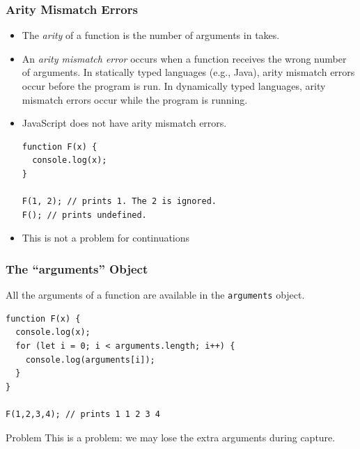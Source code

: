 \documentclass[8pt,pdf,handout]{beamer}
\begin{document}
\begin{frame}[fragile]
\frametitle{Arity Mismatch Errors}

\begin{itemize}

\item The \emph{arity} of a function is the number of arguments in takes.

\item An \emph{arity mismatch error} occurs when a function receives the wrong
number of arguments. In statically typed languages (e.g., Java), arity mismatch
errors occur before the program is run. In dynamically typed languages,
arity mismatch errors occur while the program is running.

\item JavaScript does not have arity mismatch errors.

\begin{lstlisting}
function F(x) {
  console.log(x);
}

F(1, 2); // prints 1. The 2 is ignored.
F(); // prints undefined.
\end{lstlisting}

\item This is not a problem for continuations

\end{itemize}

\end{frame}

\begin{frame}[fragile]
\frametitle{The ``arguments'' Object}

All the arguments of a function are available in the
\lstinline|arguments| object.

\begin{lstlisting}
function F(x) {
  console.log(x);
  for (let i = 0; i < arguments.length; i++) {
    console.log(arguments[i]);
  }
}

F(1,2,3,4); // prints 1 1 2 3 4
\end{lstlisting}

\begin{alertblock}{Problem}
This is a problem: we may lose the extra arguments during capture.
\end{alertblock}

\end{frame}
\end{document}
